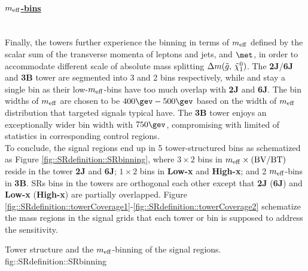 \paragraph{\underline{\textbf{$m_{\mathrm{eff}}$-bins}}} \mbox{} \\
Finally, the towers further experience the binning in terms of $m_{\mathrm{eff}}$ 
defined by the scalar sum of the transverse momenta of leptons and jets, and $\met$,
in order to accommodate different scale of absolute mass splitting $\Delta m(\tilde{g}, \, \tilde{\chi}_{1}^{0})$. 
The \textbf{2J}/\textbf{6J} and \textbf{3B} tower are segmented into 3 and 2 bins respectively, while \bLowx and \bHighx stay a single bin as their low-$m_{\mathrm{eff}}$-bins have too much overlap with \textbf{2J} and \textbf{6J}. The bin widths of $m_{\mathrm{eff}}$ are chosen to be $400\gev-500\gev$ based on the width of $m_{\mathrm{eff}}$ distribution that targeted signals typical have. The \textbf{3B} tower enjoys an exceptionally wider bin width with $750\gev$, compromising with limited of statistics in corresponding control regions. \\

To conclude, the signal regions end up in 5 tower-structured bins as schematized as Figure \ref{fig::SRdefinition::SRbinning}, where $3 \times 2$ bins in $m_{\mathrm{eff}} \times \mathrm{(BV/BT)}$ reside in the tower \textbf{2J} and \textbf{6J}; $1 \times 2$ bins in \textbf{Low-x} and \textbf{High-x}; and 2 $m_{\mathrm{eff}}$-bins in \textbf{3B}. SRs bins in the towers are orthogonal each other except that \textbf{2J} (\textbf{6J}) and \textbf{Low-x} (\textbf{High-x}) are partially overlapped. 
%
Figure \ref{fig::SRdefinition::towerCoverage1}-\ref{fig::SRdefinition::towerCoverage2} schematize the mass regions in the signal grids that each tower or bin is supposed to address the sensitivity.

{Tower structure and the $m_{\mathrm{eff}}$-binning of the signal regions.}
{fig::SRdefinition::SRbinning}

